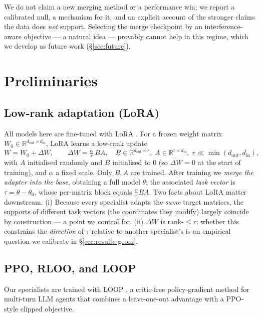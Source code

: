 \documentclass[11pt]{article}
\newcommand{\tv}{\tau}                      %
\newcommand{\base}{\theta_{0}}
\newcommand{\Real}{\mathbb{R}}
\begin{document}
We do not claim a new merging method or a performance win; we report a calibrated null,
a mechanism for it, and an explicit account of the stronger claims the data does
\emph{not} support. Selecting the merge checkpoint by an interference-aware objective ---
a natural idea --- provably cannot help in this regime, which we develop as future work
(\S\ref{sec:future}).

\section{Preliminaries}
\label{sec:prelim}

\subsection{Low-rank adaptation (LoRA)}
\label{sec:prelim-lora}
All models here are fine-tuned with LoRA \citep{hu2022lora}. For a frozen weight matrix
$W_0\in\Real^{d_{\text{out}}\times d_{\text{in}}}$, LoRA learns a low-rank update
\begin{equation}
W = W_0 + \Delta W,\qquad
\Delta W = \tfrac{\alpha}{r}\,B A,\quad
B\in\Real^{d_{\text{out}}\times r},\;A\in\Real^{r\times d_{\text{in}}},\;
r\ll\min(d_{\text{out}},d_{\text{in}}),
\end{equation}
with $A$ initialised randomly and $B$ initialised to $0$ (so $\Delta W=0$ at the start of
training), and $\alpha$ a fixed scale. Only $B,A$ are trained. After training we
\emph{merge the adapter into the base}, obtaining a full model $\theta$; the associated
\emph{task vector} is $\tv=\theta-\base$, whose per-matrix block equals
$\tfrac{\alpha}{r}BA$. Two facts about LoRA matter downstream. (i) Because every
specialist adapts the \emph{same} target matrices, the supports of different task vectors
(the coordinates they modify) largely coincide by construction --- a point we
control for. (ii) $\Delta W$ is rank-$\le r$; whether this constrains the \emph{direction}
of $\tv$ relative to another specialist's is an empirical question we calibrate in
\S\ref{sec:results-geom}.

\subsection{PPO, RLOO, and LOOP}
\label{sec:prelim-rl}
Our specialists are trained with LOOP \citep{loop2025}, a critic-free policy-gradient
method for multi-turn LLM agents that combines a leave-one-out advantage with a PPO-style
clipped objective.
\end{document}
